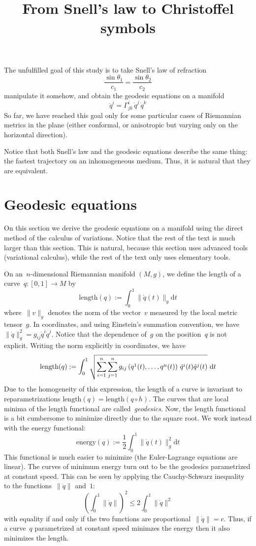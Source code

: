 \title{From Snell's law to Christoffel symbols}

The unfulfilled goal of this study is to take Snell's law of refraction
$$
\frac{\sin\theta_1}{c_1}=\frac{\sin\theta_2}{c_2}
$$
manipulate it somehow, and obtain the geodesic equations on a manifold
$$
\ddot q^i = \Gamma^i_{jk}\,\dot q^j\,\dot q^k
$$
So far, we have reached this goal only for some particular cases of Riemannian
metrics in the plane (either conformal, or anisotropic but varying only on the
horizontal direction).

Notice that both Snell's law and the geodesic equations describe the same
thing: the fastest trajectory on an inhomogeneous medium.  Thus, it is natural
that they are equivalent.

\section{Geodesic equations}

On this section we derive the geodesic equations on a manifold using the
direct method of the calculus of variations.  Notice that the rest of the
text is much larger than this section.  This is natural, because this section
uses advanced tools (variational calculus), while the rest of the text only
uses elementary tools.


On an~$n$-dimensional Riemannian manifold $(M,g)$, we define the length of a
curve~$q:[0,1]\to M$ by
$$
\mathrm{length}(q) := \int_0^1 \|\dot q(t)\|_g\mathrm{d} t
$$
where~$\|v\|_g$ denotes the norm of the vector~$v$ measured by the local
metric tensor~$g$.  In coordinates, and using Einstein's summation
convention, we have~$\|\dot q\|^2_g=g_{ij}\dot q^i\dot q^j$.  Notice that the
dependence of~$g$ on the position~$q$ is not explicit.  Writing the norm
explicitly in coordinates, we have
$$
\mathrm{length}(q) := \int_0^1
\sqrt{
	\sum_{i=1}^n
	\sum_{j=1}^n
	g_{ij}\left(q^1(t),\ldots,q^n(t)\right)
	\,
	\dot q^i(t)
	\dot q^j(t)
}
\ \mathrm{d} t
$$
Due to the homogeneity of this expression, the length of a curve is invariant
to reparametrizations $\mathrm{length}(q)=\mathrm{length}(q\circ h)$.  The
curves that are local minima of the length functional are
called~\emph{geodesics}.  Now, the length functional is a bit cumbersome to
minimize directly due to the square root.  We work instead with the energy
functional:
$$
\mathrm{energy}(q) := \frac{1}{2}\int_0^1 \|\dot q(t)\|^2_g\mathrm{d} t
$$
This functional is much easier to minimize (the Euler-Lagrange equations are
linear).  The curves of minimum energy turn out to be the geodesics
parametrized at constant speed.  This can be seen by applying the
Cauchy-Schwarz inequality to the functions~$\|\dot q\|$ and~$1$:
$$
\left(\int_0^1\|\dot q\|\right)^2\le2\int_0^1\|\dot q\|^2
$$
with equality if and only if the two functions are proportional~$\|\dot
q\|=c$.  Thus, if a curve~$q$ parametrized at constant speed minimzes the
energy then it also minimizes the length.

